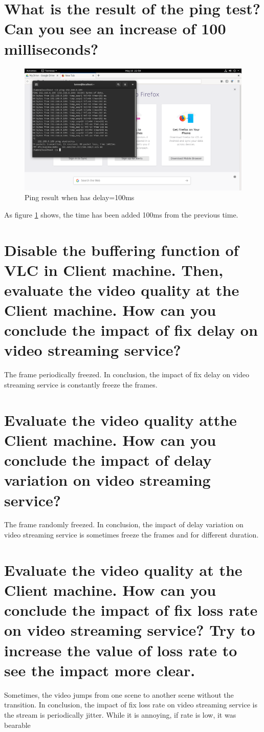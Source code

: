 \documentclass[11pt,a4paper]{article}
\begin{document}
	\section{What is the result of the ping test? Can you see an increase of 100 milliseconds?}
	\newpage
	\begin{figure}[h!]
  		\includegraphics[width=\linewidth]{ping-delay-100.png}
  		\caption{Ping result when has delay=100ms}
  		\label{fig:ping-100}
	\end{figure}
	
	As figure \ref{fig:ping-100} shows, the time has been added 100ms from the previous time.
	
	\section{Disable the buffering function of VLC in Client machine. Then, evaluate the video quality at the Client machine. How can you conclude the impact of fix delay on video streaming service?}
	The frame periodically freezed. In conclusion, the impact of fix delay on video streaming service is constantly freeze the frames.
	
	\section{Evaluate the video quality atthe Client machine. How can you conclude the impact of delay variation on video streaming service?}
	The frame randomly freezed. In conclusion, the impact of delay variation on video streaming service is sometimes freeze the frames and for different duration.
	
	\section{Evaluate the video quality at the Client machine. How can you conclude the impact of fix loss rate on video streaming service? Try to increase the value of loss rate to see the impact more clear.}
	Sometimes, the video jumps from one scene to another scene without the transition. In conclusion, the impact of fix loss rate on video streaming service is the stream is periodically jitter. While it is annoying, if rate is low, it was bearable
	
\end{document}
